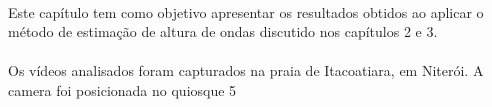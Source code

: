 \paragraph{}Este capítulo tem como objetivo apresentar os resultados obtidos ao aplicar o método de estimação de altura de ondas discutido nos capítulos 2 e 3. 

\paragraph{}Os vídeos analisados foram capturados na praia de Itacoatiara, em Niterói. A camera foi posicionada no quiosque 5